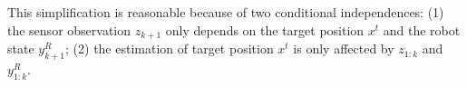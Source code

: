 \documentclass[twocolumn,10pt]{asme2e}
\begin{document}
This simplification is reasonable because of two conditional independences: (1) the sensor observation $z_{k+1}$ only depends on the target position $x^t$ and the robot state $y^R_{k+1}$;
(2) the estimation of target position $x^t$ is only affected by $z_{1:k}$ and $y^R_{1:k}$.
\end{document}

